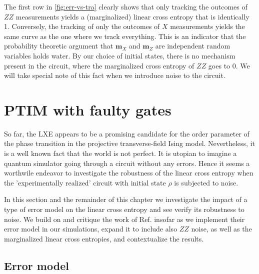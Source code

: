 The first row in \cref{fig:err-vs-tra} clearly shows that only tracking the outcomes
of $ZZ$ measurements yields a (marginalized) linear cross entropy that is
identically 1. Conversely, the tracking of only the outcomes of $X$
measurements yields the same curve as the one where we track everything. This
is an indicator that the probability theoretic argument that $\mathbf{m}_X$ and
$\mathbf{m}_Z$ are independent random variables holds water. By our choice of
initial states, there is no mechanism present in the circuit, where the
marginalized cross entropy of $ZZ$ goes to 0. We will take special note of this
fact when we introduce noise to the circuit.

\section{PTIM with faulty gates}
So far, the LXE appears to be a promising candidate for the order parameter of
the phase transition in the projective transverse-field Ising model.
Nevertheless, it is a well known fact that the world is not perfect. It is
utopian to imagine a quantum simulator going through a circuit without any
errors. Hence it seems a worthwile endeavor to investigate the robustness of the
linear cross entropy when the 'experimentally realized' circuit with initial state $\rho$ is
subjected to noise.

In this section and the remainder of this chapter we investigate the
impact of a type of error model on the linear cross entropy and see verify its
robustness to noise. We build on and critique the work of Ref.
\cite{tikhanovskayaUniversalityCrossEntropy2023} insofar as we
implement their error model in our simulations, expand it to include also $ZZ$
noise, as well as the marginalized linear cross entropies, and contextualize
the results.
\clearpage
\subsection{Error model}\label{sec:errormodel}

